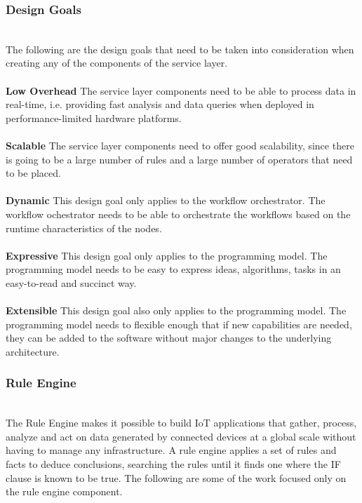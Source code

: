 \subsubsection{Design Goals}
\hfill\\
The following are the design goals that need to be taken into consideration when creating any of the components of the service layer.
\\\\
\textbf{Low Overhead} The service layer components need to be able to process data in real-time, i.e. providing fast analysis and data queries when deployed in performance-limited hardware platforms.
\\\\
\textbf{Scalable} The service layer components need to offer good scalability, since there is going to be a large number of rules and a large number of operators that need to be placed.
\\\\
\textbf{Dynamic} This design goal only applies to the workflow orchestrator. The workflow ochestrator needs to be able to orchestrate the workflows based on the runtime characteristics of the nodes. 
\\\\
\textbf{Expressive} This design goal only applies to the programming model. The programming model needs to be easy to express ideas, algorithms, tasks in an easy-to-read and succinct way.
\\\\
\textbf{Extensible} This design goal also only applies to the programming model. The programming model needs to flexible enough that if new capabilities are needed, they can be added to the software without major changes to the underlying architecture.


\subsubsection{Rule Engine}
\hfill\\
The Rule Engine makes it possible to build IoT applications that gather, process, analyze and act on data generated by connected devices at a global scale without having to manage any infrastructure. A rule engine applies a set of rules and facts to deduce conclusions, searching the rules until it finds one where the IF clause is known to be true. The following are some of the work focused only on the rule engine component.

